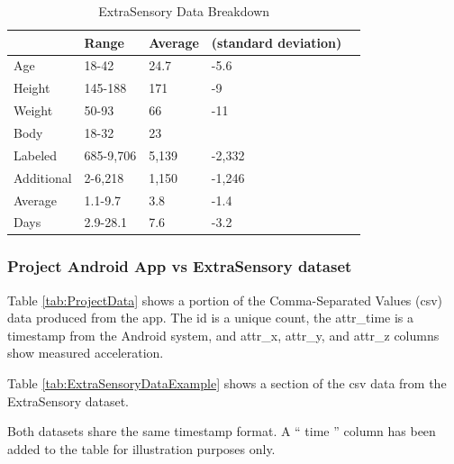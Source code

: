 \documentclass{UoNMCHA}
\newcommand{\inlineQuote}[1]{`` #1 ''}
\newcommand{\tref}[1] {Table \ref{#1}}
\numberwithin{equation}{section}
\begin{document}
\begin{table}[h]
    \begin{center}  
        \caption{ExtraSensory Data Breakdown \cite{Vaizman2017}}\label{tab:ExtraSensoryDataBreakdown}
        \begin{tabular}{lllll}
            \hline\hline 
                       & Range     & Average & (standard deviation) &  \\
            \hline 
            Age        & 18-42     & 24.7    & -5.6                 &  \\
            Height     & 145-188   & 171     & -9                   &  \\
            Weight     & 50-93     & 66      & -11                  &  \\
            Body       & 18-32     & 23      &                      &  \\
            Labeled    & 685-9,706 & 5,139   & -2,332               &  \\
            Additional & 2-6,218   & 1,150   & -1,246               &  \\
            Average    & 1.1-9.7   & 3.8     & -1.4                 &  \\
            Days       & 2.9-28.1  & 7.6     & -3.2 \\
            \hline  
            \end{tabular}
    \end{center}
\end{table}

\subsubsection{Project Android App vs ExtraSensory dataset}
\tref{tab:ProjectData} shows a portion of the Comma-Separated Values (csv) data produced from the app. The id is a unique count, the attr\_time is a timestamp from the Android system, and attr\_x, attr\_y, and attr\_z columns show measured acceleration.

\tref{tab:ExtraSensoryDataExample} shows a section of the csv data from the ExtraSensory dataset. 

Both datasets share the same timestamp format. A \inlineQuote{time} column has been added to the table for illustration purposes only.
\end{document}
